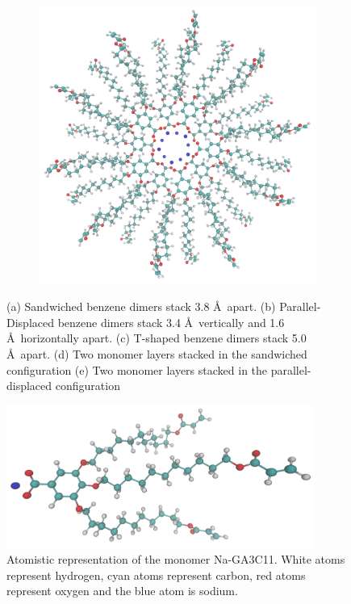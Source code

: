 \documentclass{article}
\newcommand{\angstrom}{\textup{\AA}}
\begin{document}
\begin{figure}
\begin{subfigure}[b]{0.475\textwidth}
                \caption{}\label{fig:sandwichedlayers}
        \end{subfigure}
        \begin{subfigure}[b]{0.475\textwidth}
                \centering
                \includegraphics[width=\textwidth]{offsetlayers.png}
                \caption{}\label{fig:offsetlayers}
        \end{subfigure}
        \caption{(a) Sandwiched benzene dimers stack 3.8 \angstrom~apart. (b) Parallel-Displaced benzene dimers stack
        3.4 \angstrom~vertically and 1.6 \angstrom~horizontally apart. (c) T-shaped benzene dimers stack 5.0 \angstrom~apart.
        (d) Two monomer layers stacked in the sandwiched configuration (e) Two monomer layers stacked in the parallel-displaced
        configuration }\label{fig:stacking}
  \end{figure}

  \begin{figure}
	\centering
        \includegraphics[width=0.9\textwidth]{monomer.png}
	\caption{Atomistic representation of the monomer Na-GA3C11. White atoms
		represent hydrogen, cyan atoms represent carbon, red atoms represent oxygen and
		the blue atom is sodium.}\label{fig:monomer}
  \end{figure}
\end{document}
